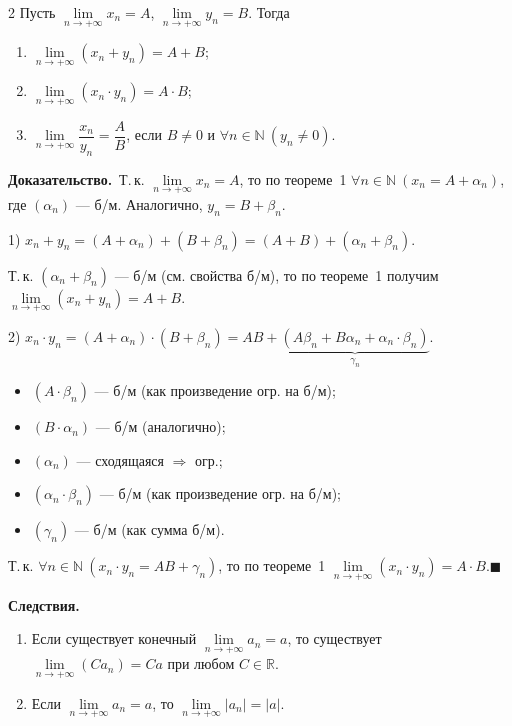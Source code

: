 \documentclass[a4paper,11pt]{article}
\newcommand{\dok}{\textbf{Доказательство.}\ }
\newcommand{\qedr}{\hfill$\blacksquare$}
\begin{document}
\begin{teor}{2}
  Пусть $\lim\limits_{n \to +\infty} x_n = A$, $\lim\limits_{n \to +\infty} y_n = B$. Тогда
  \begin{enumerate}
    \item $\lim\limits_{n \to +\infty} (x_n + y_n) = A + B$;
    \item $\lim\limits_{n \to +\infty} (x_n \cdot y_n) = A \cdot B$;
    \item $\lim\limits_{n \to +\infty} \dfrac{x_n}{y_n} = \dfrac{A}{B}$, если $B \ne 0$ и
      $\forall n \in \mathbb{N}\ (y_n \ne 0)$.
  \end{enumerate}
\end{teor}

\dok Т.\,к. $\lim\limits_{n \to +\infty} x_n = A$, то по теореме~1
$\forall n \in \mathbb{N}\ (x_n = A + \alpha_n)$, где $(\alpha_n)$ --- б/м.
Аналогично, $y_n = B + \beta_n$.

1) $x_n + y_n = (A + \alpha_n) + (B + \beta_n) = (A + B) + (\alpha_n + \beta_n)$.

Т.\,к. $(\alpha_n + \beta_n)$ --- б/м (см. свойства б/м), то по
теореме~1 получим $\lim\limits_{n \to +\infty} (x_n + y_n) = A + B$.

2) $x_n \cdot y_n = (A + \alpha_n) \cdot (B + \beta_n)
   = AB + \underbrace{(A\beta_n + B\alpha_n + \alpha_n \cdot \beta_n)}_{\gamma_n}$.

\begin{itemize}
  \item $(A \cdot \beta_n)$ --- б/м (как произведение огр. на б/м);
  \item $(B \cdot \alpha_n)$ --- б/м (аналогично);
  \item $(\alpha_n)$ --- сходящаяся $\Rightarrow$ огр.;
  \item $(\alpha_n \cdot \beta_n)$ --- б/м (как произведение огр. на б/м);
  \item $(\gamma_n)$ --- б/м (как сумма б/м).
\end{itemize}

Т.\,к. $\forall n \in \mathbb{N}\ (x_n \cdot y_n = AB + \gamma_n)$, то по
теореме~1 $\lim\limits_{n \to +\infty} (x_n \cdot y_n) = A \cdot B$.\qedr

\textbf{Следствия.}
\begin{enumerate}
  \item Если существует конечный $\lim\limits_{n \to +\infty} a_n = a$, то существует
    $\lim\limits_{n \to +\infty} (C a_n) = Ca$ при любом $C \in \mathbb{R}$.
  \item Если $\lim\limits_{n \to +\infty} a_n = a$, то $\lim\limits_{n \to +\infty} |a_n| = |a|$.
\end{enumerate}
\end{document}
